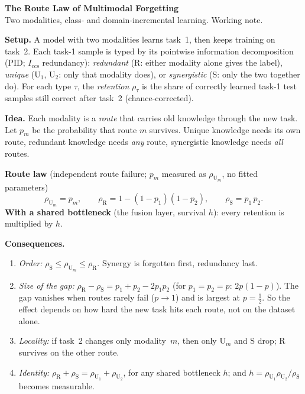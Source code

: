\documentclass[10pt]{article}
\begin{document}
{\large\bfseries The Route Law of Multimodal Forgetting}\\[1pt]
{\small Two modalities, class- and domain-incremental learning. Working note.}

\textbf{Setup.} A model with two modalities learns task~1, then keeps training on task~2. Each task-1 sample is typed by
its pointwise information decomposition (PID; $I_{\text{ccs}}$ redundancy): \emph{redundant} (R: either modality alone
gives the label), \emph{unique} (U$_1$, U$_2$: only that modality does), or \emph{synergistic} (S: only the two
together do). For each type $\tau$, the \emph{retention} $\rho_\tau$ is the share of correctly learned task-1 test samples
still correct after task~2 (chance-corrected).

\textbf{Idea.} Each modality is a \emph{route} that carries old knowledge through the new task. Let $p_m$ be the
probability that route $m$ survives. Unique knowledge needs its own route, redundant knowledge needs \emph{any} route,
synergistic knowledge needs \emph{all} routes.

\begin{tcolorbox}[colback=gray!6,colframe=black!55,boxrule=0.5pt,left=4pt,right=4pt,top=2pt,bottom=2pt]
\textbf{Route law} (independent route failure; $p_m$ measured as $\rho_{\text{U}_m}$, no fitted parameters)
\[
\rho_{\text{U}_m} = p_m, \qquad
\rho_{\text{R}} = 1-(1-p_1)(1-p_2), \qquad
\rho_{\text{S}} = p_1\,p_2 .
\]
\textbf{With a shared bottleneck} (the fusion layer, survival $h$): every retention is multiplied by $h$.
\end{tcolorbox}

\textbf{Consequences.}
\begin{enumerate}[label=\arabic*.]
\item \emph{Order:} $\rho_{\text{S}} \le \rho_{\text{U}_m} \le \rho_{\text{R}}$. Synergy is forgotten first, redundancy last.
\item \emph{Size of the gap:} $\rho_{\text{R}}-\rho_{\text{S}} = p_1+p_2-2p_1p_2$ (for $p_1{=}p_2{=}p$: $2p(1-p)$). The gap vanishes
when routes rarely fail ($p\!\to\!1$) and is largest at $p=\tfrac12$. So the effect depends on how hard the new task hits
each route, not on the dataset alone.
\item \emph{Locality:} if task~2 changes only modality~$m$, then only U$_m$ and S drop; R survives on the other route.
\item \emph{Identity:} $\rho_{\text{R}}+\rho_{\text{S}}=\rho_{\text{U}_1}+\rho_{\text{U}_2}$, for any shared bottleneck $h$; and $h=\rho_{\text{U}_1}\rho_{\text{U}_2}/\rho_{\text{S}}$ becomes measurable.
\end{enumerate}
\end{document}
